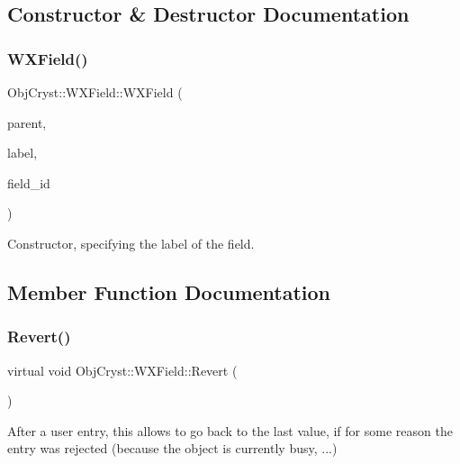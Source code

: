 \subsection{Constructor \& Destructor Documentation}
\mbox{\label{class_obj_cryst_1_1_w_x_field_a750b0a756fd49172806fd5af020a1e07}} 
\subsubsection{\texorpdfstring{WXField()}{WXField()}}
{\footnotesize\ttfamily Obj\+Cryst\+::\+W\+X\+Field\+::\+W\+X\+Field (\begin{DoxyParamCaption}\item[{wx\+Window $\ast$}]{parent,  }\item[{const string \&}]{label,  }\item[{const int}]{field\+\_\+id }\end{DoxyParamCaption})}

Constructor, specifying the label of the field. 

\subsection{Member Function Documentation}
\mbox{\label{class_obj_cryst_1_1_w_x_field_a178d6d770d1e3adfa02e27da94b2dffa}} 
\subsubsection{\texorpdfstring{Revert()}{Revert()}}
{\footnotesize\ttfamily virtual void Obj\+Cryst\+::\+W\+X\+Field\+::\+Revert (\begin{DoxyParamCaption}{ }\end{DoxyParamCaption})\hspace{0.3cm}{\ttfamily [pure virtual]}}

After a user entry, this allows to go back to the last value, if for some reason the entry was rejected (because the object is currently busy, ...) 

